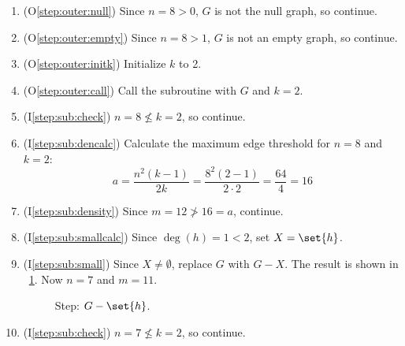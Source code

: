 \begin{enumerate}
\item (O\ref{step:outer:null}) Since \(n=8>0\), \(G\) is not the null graph, so continue.

\item (O\ref{step:outer:empty}) Since \(n=8>1\), \(G\) is not an empty graph, so continue.

\item (O\ref{step:outer:initk}) Initialize \(k\) to 2.

\item (O\ref{step:outer:call}) Call the subroutine with \(G\) and \(k=2\).

\item (I\ref{step:sub:check}) \(n=8\nleq k=2\), so continue.

\item (I\ref{step:sub:dencalc}) Calculate the maximum edge threshold for \(n=8\) and \(k=2\):
  \[a=\frac{n^2(k-1)}{2k}=\frac{8^2(2-1)}{2\cdot2}=\frac{64}{4}=16\]

\item (I\ref{step:sub:density}) Since \(m=12\ngtr16=a\), continue.

\item (I\ref{step:sub:smallcalc}) Since \(\deg(h)=1<2\), set \(X=\set{h}\).

\item (I\ref{step:sub:small}) Since \(X\ne\emptyset\), replace \(G\) with \(G-X\).  The result is shown in
  \figurename~\ref{fig:removeh}.  Now \(n=7\) and \(m=11\).

  \begin{figure}[H]
    \centering
    \caption{Step: \(G-\set{h}\).}
    \label{fig:removeh}
  \end{figure}

\item (I\ref{step:sub:check}) \(n=7\nleq k=2\), so continue.


\end{enumerate}
